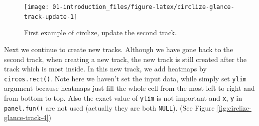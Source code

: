\documentclass[]{book}
\newenvironment{Shaded}{\begin{snugshade}}{\end{snugshade}}
\newcommand{\KeywordTok}[1]{\textcolor[rgb]{0.13,0.29,0.53}{\textbf{#1}}}
\newcommand{\DataTypeTok}[1]{\textcolor[rgb]{0.13,0.29,0.53}{#1}}
\newcommand{\DecValTok}[1]{\textcolor[rgb]{0.00,0.00,0.81}{#1}}
\newcommand{\FloatTok}[1]{\textcolor[rgb]{0.00,0.00,0.81}{#1}}
\newcommand{\StringTok}[1]{\textcolor[rgb]{0.31,0.60,0.02}{#1}}
\newcommand{\OtherTok}[1]{\textcolor[rgb]{0.56,0.35,0.01}{#1}}
\newcommand{\ControlFlowTok}[1]{\textcolor[rgb]{0.13,0.29,0.53}{\textbf{#1}}}
\newcommand{\OperatorTok}[1]{\textcolor[rgb]{0.81,0.36,0.00}{\textbf{#1}}}
\newcommand{\NormalTok}[1]{#1}
\begin{document}
\begin{figure}

{\centering \texttt{[image: 01-introduction\_files/figure-latex/circlize-glance-track-update-1]} 

}

\caption{First example of circlize, update the second track.}\label{fig:circlize-glance-track-update}
\end{figure}

Next we continue to create new tracks. Although we have gone back to the
second track, when creating a new track, the new track is still created
after the track which is most inside. In this new track, we add heatmaps
by \texttt{circos.rect()}. Note here we haven't set the input data,
while simply set \texttt{ylim} argument because heatmaps just fill the
whole cell from the most left to right and from bottom to top. Also the
exact value of \texttt{ylim} is not important and \texttt{x}, \texttt{y}
in \texttt{panel.fun()} are not used (actually they are both
\texttt{NULL}). (See Figure \ref{fig:circlize-glance-track-4})

\begin{Shaded}
\end{Shaded}
\end{document}
